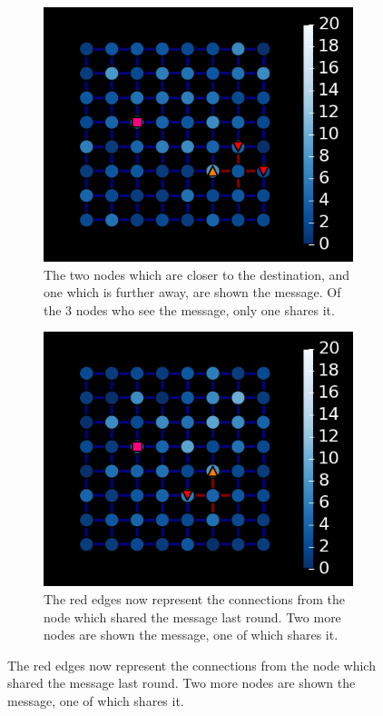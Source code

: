 \documentclass[bsc,frontabs,twoside,singlespacing,parskip,deptreport]{infthesis}     %
\begin{document}
\begin{figure}
\centering
\begin{subfigure}[]{0.47\textwidth}
\includegraphics[width=0.99\textwidth]{visualisation_1}
\caption{The two nodes which are closer to the destination, and one which is further away, are shown the message. Of the 3 nodes who see the message, only one shares it.}
\end{subfigure}
\quad
\begin{subfigure}[]{0.47\textwidth}
\includegraphics[width=0.99\textwidth]{visualisation_2}
\caption{The red edges now represent the connections from the node which shared the message last round. Two more nodes are shown the message, one of which shares it.}

\end{subfigure}
\end{figure}
\end{document}
